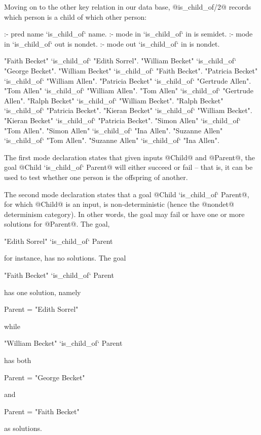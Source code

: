 Moving on to the other key relation in our data base, @is_child_of/2@
records which person is a child of which other person:
\begin{myverbatim}
:- pred name `is_child_of` name.
:- mode in   `is_child_of` in  is semidet.
:- mode in   `is_child_of` out is nondet.
:- mode out  `is_child_of` in  is nondet.

"Faith Becket"      `is_child_of`   "Edith Sorrel".
"William Becket"    `is_child_of`   "George Becket".
"William Becket"    `is_child_of`   "Faith Becket".
"Patricia Becket"   `is_child_of`   "William Allen".
"Patricia Becket"   `is_child_of`   "Gertrude Allen".
"Tom Allen"         `is_child_of`   "William Allen".
"Tom Allen"         `is_child_of`   "Gertrude Allen".
"Ralph Becket"      `is_child_of`   "William Becket".
"Ralph Becket"      `is_child_of`   "Patricia Becket".
"Kieran Becket"     `is_child_of`   "William Becket".
"Kieran Becket"     `is_child_of`   "Patricia Becket".
"Simon Allen"       `is_child_of`   "Tom Allen".
"Simon Allen"       `is_child_of`   "Ina Allen".
"Suzanne Allen"     `is_child_of`   "Tom Allen".
"Suzanne Allen"     `is_child_of`   "Ina Allen".
\end{myverbatim}
The first mode declaration states that given inputs @Child@ and @Parent@,
the goal @Child `is_child_of` Parent@ will either succeed or fail -- that
is, it can be used to test whether one person is the offspring of another.

The second mode declaration states that a goal
@Child `is_child_of` Parent@, for which @Child@ is an input, is
non-deterministic (hence the @nondet@ determinism category).  In other
words, the goal may fail or have one or more solutions for @Parent@.
The goal,
\begin{myverbatim}
    "Edith Sorrel" `is_child_of` Parent
\end{myverbatim}
for instance, has no solutions.  The goal
\begin{myverbatim}
    "Faith Becket" `is_child_of` Parent
\end{myverbatim}
has one solution, namely
\begin{myverbatim}
    Parent = "Edith Sorrel"
\end{myverbatim}
while
\begin{myverbatim}
    "William Becket" `is_child_of` Parent
\end{myverbatim}
has both
\begin{myverbatim}
    Parent = "George Becket"
\end{myverbatim}
and
\begin{myverbatim}
    Parent = "Faith Becket"
\end{myverbatim}
as solutions.

